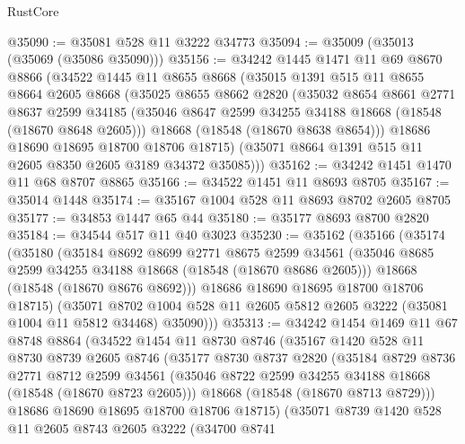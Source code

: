 \begin{lexlean}{RustCore}
\begin{coremodule}
@35090 := @35081 @528 @11 @3222 @34773
@35094 := @35009 (@35013 (@35069 (@35086 @35090)))
@35156 := @34242
    @1445
    @1471
    @11
    @69
    @8670
    @8866
    (@34522
      @1445
      @11
      @8655
      @8668
      (@35015
        @1391
        @515
        @11
        @8655
        @8664
        @2605
        @8668
        (@35025
          @8655
          @8662
          @2820
          (@35032
            @8654
            @8661
            @2771
            @8637
            @2599
            @34185
            (@35046 @8647 @2599 @34255 @34188 @18668 (@18548 (@18670 @8648 @2605)))
            @18668
            (@18548 (@18670 @8638 @8654)))
          @18686
          @18690
          @18695
          @18700
          @18706
          @18715)
        (@35071 @8664 @1391 @515 @11 @2605 @8350 @2605 @3189 @34372 @35085)))
@35162 := @34242 @1451 @1470 @11 @68 @8707 @8865
@35166 := @34522 @1451 @11 @8693 @8705
@35167 := @35014 @1448
@35174 := @35167 @1004 @528 @11 @8693 @8702 @2605 @8705
@35177 := @34853 @1447 @65 @44
@35180 := @35177 @8693 @8700 @2820
@35184 := @34544 @517 @11 @40 @3023
@35230 := @35162
    (@35166
      (@35174
        (@35180
          (@35184
            @8692
            @8699
            @2771
            @8675
            @2599
            @34561
            (@35046 @8685 @2599 @34255 @34188 @18668 (@18548 (@18670 @8686 @2605)))
            @18668
            (@18548 (@18670 @8676 @8692)))
          @18686
          @18690
          @18695
          @18700
          @18706
          @18715)
        (@35071
          @8702
          @1004
          @528
          @11
          @2605
          @5812
          @2605
          @3222
          (@35081 @1004 @11 @5812 @34468)
          @35090)))
@35313 := @34242
    @1454
    @1469
    @11
    @67
    @8748
    @8864
    (@34522
      @1454
      @11
      @8730
      @8746
      (@35167
        @1420
        @528
        @11
        @8730
        @8739
        @2605
        @8746
        (@35177
          @8730
          @8737
          @2820
          (@35184
            @8729
            @8736
            @2771
            @8712
            @2599
            @34561
            (@35046 @8722 @2599 @34255 @34188 @18668 (@18548 (@18670 @8723 @2605)))
            @18668
            (@18548 (@18670 @8713 @8729)))
          @18686
          @18690
          @18695
          @18700
          @18706
          @18715)
        (@35071
          @8739
          @1420
          @528
          @11
          @2605
          @8743
          @2605
          @3222
          (@34700
            @8741

\end{coremodule}
\end{lexlean}
